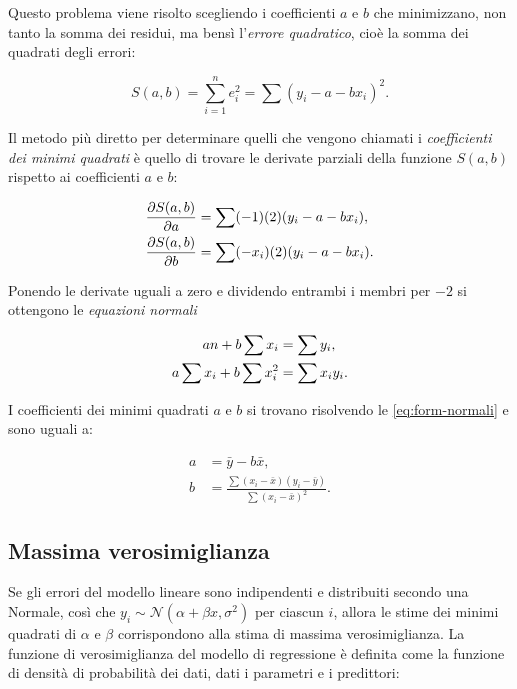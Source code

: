 \documentclass[
]{memoir}
\theoremstyle{definition}
\theoremstyle{definition}
\theoremstyle{definition}
\theoremstyle{definition}
\theoremstyle{remark}
\begin{document}
Questo problema viene risolto scegliendo i coefficienti \(a\) e \(b\) che minimizzano, non tanto la somma dei residui, ma bensì l'\emph{errore quadratico}, cioè la somma dei quadrati degli errori:

\begin{equation}
S(a, b) = \sum_{i=1}^{n} e_i^2 = \sum (y_i - a - b x_i)^2.
\end{equation}

Il metodo più diretto per determinare quelli che vengono chiamati i \emph{coefficienti dei minimi quadrati} è quello di trovare le derivate parziali della funzione \(S(a, b)\) rispetto ai coefficienti \(a\) e \(b\):

\begin{align}
\frac{\partial S(a,b)}{\partial a} &= \sum (-1)(2)(y_i - a - b x_i), \notag \\
\frac{\partial S(a,b)}{\partial b} &= \sum (-x_i)(2)(y_i - a - b x_i).
\end{align}

Ponendo le derivate uguali a zero e dividendo entrambi i membri per \(-2\) si ottengono le \emph{equazioni normali}

\begin{align}
 an + b \sum x_i &= \sum y_i, \notag \\
 a \sum x_i + b \sum x_i^2 &= \sum x_i y_i. 
 \label{eq:form-normali}
\end{align}

I coefficienti dei minimi quadrati \(a\) e \(b\) si trovano risolvendo le \eqref{eq:form-normali} e sono uguali a:

\begin{align}
a &= \bar{y} - b \bar{x},\\
b &= \frac{\sum (x_i - \bar{x}) (y_i - \bar{y})}{\sum (x_i - \bar{x})^2}.
\label{eq:minsq-ab}
\end{align}

\hypertarget{massima-verosimiglianza}{%
\subsection{Massima verosimiglianza}\label{massima-verosimiglianza}}

Se gli errori del modello lineare sono indipendenti e distribuiti secondo una Normale, così che \(y_i \sim \mathcal{N}(\alpha + \beta x, \sigma^2)\) per ciascun \(i\), allora le stime dei minimi quadrati di \(\alpha\) e \(\beta\) corrispondono alla stima di massima verosimiglianza. La funzione di verosimiglianza del modello di regressione è definita come la funzione di densità di probabilità dei dati, dati i parametri e i predittori:
\end{document}
